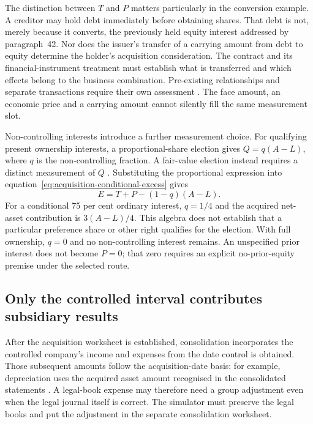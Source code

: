 The distinction between $T$ and $P$ matters particularly in the conversion example. A creditor may hold debt immediately before obtaining shares. That debt is not, merely because it converts, the previously held equity interest addressed by paragraph~42. Nor does the issuer's transfer of a carrying amount from debt to equity determine the holder's acquisition consideration. The contract and its financial-instrument treatment must establish what is transferred and which effects belong to the business combination. Pre-existing relationships and separate transactions require their own assessment \citep[paras.~42, 51--53 and B50--B53]{aasb3scope2026}. The face amount, an economic price and a carrying amount cannot silently fill the same measurement slot.

Non-controlling interests introduce a further measurement choice. For qualifying present ownership interests, a proportional-share election gives $Q=q(A-L)$, where $q$ is the non-controlling fraction. A fair-value election instead requires a distinct measurement of $Q$ \citep[para.~19]{aasb3scope2026}. Substituting the proportional expression into equation~\eqref{eq:acquisition-conditional-excess} gives
\begin{equation}
 E=T+P-(1-q)(A-L).
 \label{eq:acquisition-proportional-excess}
\end{equation}
For a conditional 75 per cent ordinary interest, $q=1/4$ and the acquired net-asset contribution is $3(A-L)/4$. This algebra does not establish that a particular preference share or other right qualifies for the election. With full ownership, $q=0$ and no non-controlling interest remains. An unspecified prior interest does not become $P=0$; that zero requires an explicit no-prior-equity premise under the selected route.

\subsection{Only the controlled interval contributes subsidiary results}

After the acquisition worksheet is established, consolidation incorporates the controlled company's income and expenses from the date control is obtained. Those subsequent amounts follow the acquisition-date basis: for example, depreciation uses the acquired asset amount recognised in the consolidated statements \citep[para.~20 and B86--B88]{aasb10control2026}. A legal-book expense may therefore need a group adjustment even when the legal journal itself is correct. The simulator must preserve the legal books and put the adjustment in the separate consolidation worksheet.

